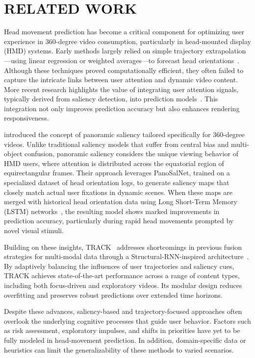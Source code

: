 \section{RELATED WORK}
Head movement prediction has become a critical component for optimizing user experience in 360-degree video consumption, particularly in head-mounted display (HMD) systems. 
Early methods largely relied on simple trajectory extrapolation—using linear regression or weighted averages—to forecast head orientations~\cite{qian2016optimizing, duanmu2017prioritized}.
Although these techniques proved computationally efficient, they often failed to capture the intricate links between user attention and dynamic video content. 
More recent research highlights the value of integrating user attention signals, typically derived from saliency detection, into prediction models~\cite{rondon2022track}.
This integration not only improves prediction accuracy but also enhances rendering responsiveness.

\cite{nguyen2018your} introduced the concept of panoramic saliency tailored specifically for 360-degree videos. Unlike traditional saliency models that suffer from central bias and multi-object confusion, panoramic saliency considers the unique viewing behavior of HMD users, where attention is distributed across the equatorial region of equirectangular frames. 
Their approach leverages PanoSalNet, trained on a specialized dataset of head orientation logs, to generate saliency maps that closely match actual user fixations in dynamic scenes. 
When these maps are merged with historical head orientation data using Long Short-Term Memory (LSTM) networks~\cite{hochreiter1997long}, the resulting model shows marked improvements in prediction accuracy, particularly during rapid head movements prompted by novel visual stimuli.

Building on these insights, TRACK~\cite{rondon2022track} addresses shortcomings in previous fusion strategies for multi-modal data through a Structural-RNN-inspired architecture~\cite{jain2016structural}. 
By adaptively balancing the influences of user trajectories and saliency cues, TRACK achieves state-of-the-art performance across a range of content types, including both focus-driven and exploratory videos. Its modular design reduces overfitting and preserves robust predictions over extended time horizons.

Despite these advances, saliency-based and trajectory-focused approaches often overlook the underlying cognitive processes that guide user behavior. Factors such as risk assessment, exploratory impulses, and shifts in priorities have yet to be fully modeled in head-movement prediction. In addition, domain-specific data or heuristics can limit the generalizability of these methods to varied scenarios.

